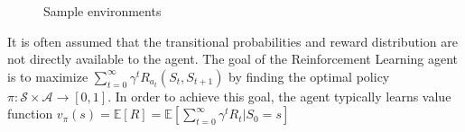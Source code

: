 \documentclass[a0]{a0poster}
\begin{document}
\begin{textblock}{7.0}
\begin{center}
\begin{figure}%
    \centering
    \qquad
    \caption{Sample environments}%
    \label{fig:example}%
\end{figure}
\end{center}

It is often assumed that the transitional probabilities and reward distribution
are not directly available to the agent. The goal of the Reinforcement Learning
agent is to maximize $\sum_{t=0}^{\infty} \gamma^t R_{a_{t}}(S_{t}, S_{t + 1})$
by finding the optimal policy $\pi: \mathcal{S} \times \mathcal{A} \rightarrow
[0, 1]$. In order to achieve this goal, the agent typically learns value
function $v_\pi(s) = \mathbb{E}[R] = {\mathbb{E}}[\sum_{t=0}^\infty \gamma^t
R_t | S_0 = s]$

\end{textblock}
\end{document}
